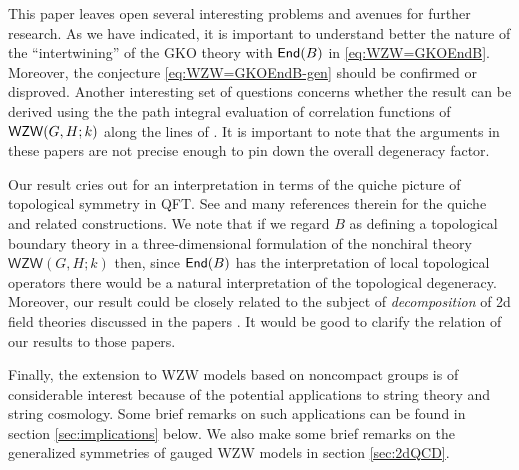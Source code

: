 \documentclass[a4paper,11pt]{article}
\newcommand{\tsf}[1]{\textsf{#1}}
\def\fg{\mathfrak{g}}
\def\fh{\mathfrak{h}}
\begin{document}
 

This paper leaves open several interesting problems and avenues for further research. 
As we have indicated, it is important to understand better the nature of the ``intertwining'' of the \tsf{GKO} theory with $\mathsf{End}(B)$ in  \eqref{eq:WZW=GKOEndB}. Moreover, the conjecture
\eqref{eq:WZW=GKOEndB-gen} should be confirmed or disproved. Another interesting set of questions 
concerns whether the result can be derived using the the path integral evaluation of correlation functions of  $\mathsf{WZW}(G,H;k)$   along the lines of  \cite{Gawedzki:1988nj,Witten:1991mm}. It is important to note that the arguments in these papers are not precise enough to pin down the overall degeneracy factor. 

Our result cries out for an interpretation in terms of 
the quiche picture of topological symmetry in \tsf{QFT}. See \cite{Freed:2022qnc,Moore:2025tmt}
and many references therein for the quiche and related constructions. We note that if we regard $B$ as defining a topological boundary theory in a three-dimensional formulation of the nonchiral theory $\tsf{WZW}(G,H;k)$ then, since $\mathsf{End}(B)$ has the interpretation of local topological operators there would be a natural interpretation of the topological degeneracy. Moreover, our result could be closely related to the subject of \emph{decomposition} of 2d field theories discussed in the papers \cite{Sharpe:2022ene,Pantev:2005rh,Hellerman:2006zs,Pantev:2005zs}. It would be good to clarify the relation of our results to those papers. 



Finally, the extension to \tsf{WZW} models based on noncompact groups is of considerable interest because of the potential applications to string theory and string cosmology. Some brief remarks on such applications can be found in section \ref{sec:implications} below. We also make some brief remarks on the generalized symmetries of gauged \tsf{WZW} models in section \ref{sec:2dQCD}. 




\end{document}

